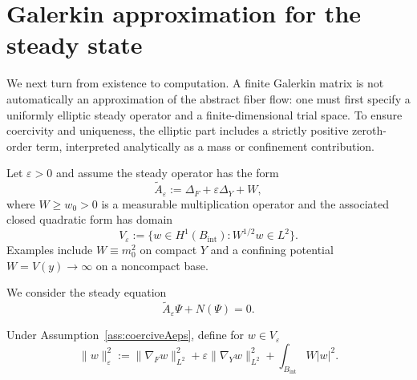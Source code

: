 \documentclass[11pt]{article}
\providecommand{\Bint}{B_{\mathrm{int}}}
\begin{document}
\section{Galerkin approximation for the steady state}

We next turn from existence to computation.  A finite Galerkin matrix is not
automatically an approximation of the abstract fiber flow: one must first
specify a uniformly elliptic steady operator and a finite-dimensional trial
space.  To ensure coercivity and uniqueness, the elliptic part includes a
strictly positive zeroth-order term, interpreted analytically as a mass or
confinement contribution.

\begin{assumption}\label{ass:coerciveAeps}
Let $\varepsilon>0$ and assume the steady operator has the form
\[
\widetilde A_\varepsilon := \Delta_F + \varepsilon\Delta_Y + W,
\]
where $W\ge w_0>0$ is a measurable multiplication operator and the associated
closed quadratic form has domain
\[
V_\varepsilon:=\{w\in H^1(\Bint):W^{1/2}w\in L^2\}.
\]
Examples include $W\equiv m_0^2$ on compact $Y$ and a confining potential
$W=V(y)\to\infty$ on a noncompact base.
\end{assumption}

We consider the steady equation
\begin{equation}\label{eq:steady}
\widetilde A_\varepsilon \Psi + N(\Psi)=0.
\end{equation}

\begin{definition}
Under Assumption~\ref{ass:coerciveAeps}, define for $w\in V_\varepsilon$
\[
\|w\|_{\varepsilon}^2
:= \|\nabla_F w\|_{L^2}^2 + \varepsilon\|\nabla_Y w\|_{L^2}^2
+\int_{\Bint}W|w|^2.
\]
\end{definition}
\end{document}
